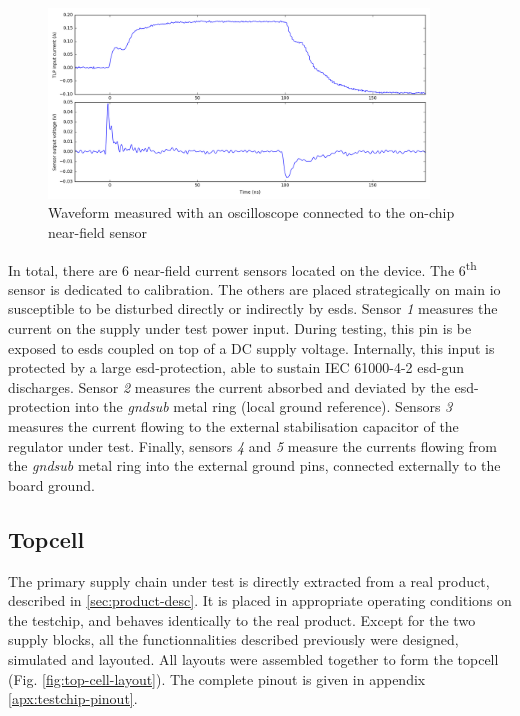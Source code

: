 \begin{figure}[!h]
  \centering
  \includegraphics[width=0.9\textwidth]{src/3/figures/measured_waveform.png}
  \caption{Waveform measured with an oscilloscope connected to the on-chip near-field sensor}
  \label{fig:nfs-wvf}
\end{figure}

In total, there are 6 near-field current sensors located on the device.
The 6\textsuperscript{th} sensor is dedicated to calibration.
The others are placed strategically on main \gls{io} susceptible to be disturbed directly or indirectly by \gls{esd}s.
Sensor \textit{1} measures the current on the supply under test power input.
During testing, this pin is be exposed to \gls{esd}s coupled on top of a DC supply voltage.
Internally, this input is protected by a large \gls{esd-protection}, able to sustain IEC 61000-4-2 \gls{esd-gun} discharges.
Sensor \textit{2} measures the current absorbed and deviated by the \gls{esd-protection} into the \textit{gndsub} metal ring (local ground reference).
Sensors \textit{3} measures the current flowing to the external stabilisation capacitor of the regulator under test.
Finally, sensors \textit{4} and \textit{5} measure the currents flowing from the \textit{gndsub} metal ring into the external ground pins, connected externally to the board ground.

\subsection{Topcell}

%
The primary supply chain under test is directly extracted from a real product, described in \ref{sec:product-desc}.
It is placed in appropriate operating conditions on the testchip, and behaves identically to the real product.
Except for the two supply blocks, all the functionnalities described previously were designed, simulated and layouted.
All layouts were assembled together to form the topcell (Fig. \ref{fig:top-cell-layout}).
The complete pinout is given in appendix \ref{apx:testchip-pinout}.


